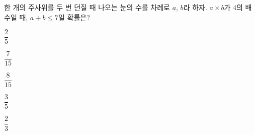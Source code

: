한 개의 주사위를 두 번 던질 때 나오는 눈의 수를 차례로 $a$, $b$라 하자. $a\times b$가 $4$의 배수일 때, $a+b\le 7$일 확률은?
\begin{choices32}{\rule[-3ex]{0pt}{8ex}$\dfrac{2}{5}$}{\rule[-3ex]{0pt}{8ex}$\dfrac{7}{15}$}{\rule[-3ex]{0pt}{8ex}$\dfrac{8}{15}$}{\rule[-3ex]{0pt}{8ex}$\dfrac{3}{5}$}{\rule[-3ex]{0pt}{8ex}$\dfrac{2}{3}$}\end{choices32}
